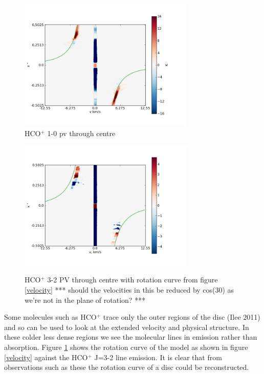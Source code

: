 \documentclass[useAMS,usenatbib]{mn2e}
\begin{document}
\begin{figure}
 \includegraphics[width=84mm]{Figures/sim/imageHCOp_1-0_30deg_PV_centre.png}

 \caption{HCO$^+$ 1-0 pv through centre}
\end{figure}

\begin{figure}
 \includegraphics[width=84mm]{Figures/sim/imageHCOp_3-2_30deg_PV_centre_2.png}
 \label{hcop_pv}
 \caption{HCO$^+$ 3-2 PV through centre with rotation curve from figure \ref{velocity} *** should the velocities in this be reduced by cos(30) as we're not in the plane of rotation? ***}
\end{figure}

Some molecules such as HCO$^+$ trace only the outer regions of the disc (Ilee 2011) and so can be used to look at the extended velocity and physical structure. In these colder less dense regions we see the molecular lines in emission rather than absorption. Figure \ref{hcop_pv} shows the rotation curve of the model as shown in figure \ref{velocity} against the HCO$^+$ J=3-2 line emission. It is clear that from observations such as these the rotation curve of a disc could be reconstructed.\newline
\newline
\end{document}
